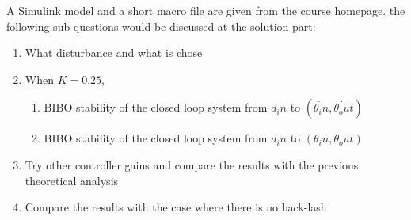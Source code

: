 A Simulink model and a short macro file are given from the course homepage. the following sub-questions would be discussed at the solution part:
\begin{enumerate}
  \item What disturbance and what \delta is chose
  \item When $K=0.25$,
  \begin{enumerate}
  \item BIBO stability of the closed loop system from $d_in$ to $(\dot{\theta_in},\dot{\theta_out})$ 
  \item BIBO stability of the closed loop system from $d_in$ to $(\theta_in,\theta_out)$
  \end{enumerate}
  \item Try other controller gains and compare the results with the previous theoretical analysis
  \item Compare the results with the case where there is no back-lash
\end{enumerate}